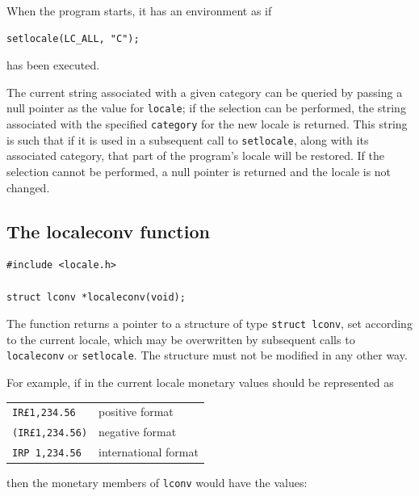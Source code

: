    When the program starts, it has an environment as if


   \begin{Verbatim}
setlocale(LC_ALL, "C");
\end{Verbatim}

   has been executed.


   The current string associated with a given category  can  be
    queried  by  passing a null pointer as the value for \texttt{locale};
    if the selection can be  performed,  the  string  associated
    with  the specified \texttt{category} for the new locale is returned.
    This string is such that if it is used in a subsequent  call to
    \texttt{setlocale}, along with its associated category, that part
    of the program's locale will be restored.  If the  selection
    cannot  be  performed,  a  null  pointer is returned and the
    locale is not changed.


  

  \subsection{The localeconv function}
   

   \begin{Verbatim}
#include <locale.h>

struct lconv *localeconv(void);
\end{Verbatim}

   The function returns a pointer to a structure of type \texttt{struct
   lconv},  set  according  to  the current locale, which may be
   overwritten by subsequent calls to \texttt{localeconv} or
   \texttt{setlocale}.  The structure must not be modified in any other
   way.


   For example, if in the current locale monetary values should
   be represented as


   \begin{tabular}{lp{\textwidth}}
     \texttt{IR\pounds1,234.56} & positive format
    \\

     \texttt{(IR\pounds1,234.56)} & negative format
    \\

     \texttt{IRP 1,234.56} & international format
    \\
\end{tabular}


   then the monetary members of \texttt{lconv} would have the
    values:


